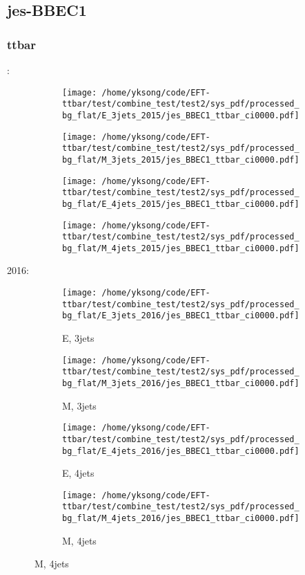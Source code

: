 \documentclass{beamer}
\begin{document}
\subsection{jes-BBEC1}

\begin{frame}
\frametitle{ttbar}
\fontsize{5}{1}:
\begin{figure}
\centering
\begin{subfigure}[b]{0.24\textwidth}
\texttt{[image: /home/yksong/code/EFT-ttbar/test/combine\_test/test2/sys\_pdf/processed\_bg\_flat/E\_3jets\_2015/jes\_BBEC1\_ttbar\_ci0000.pdf]}
\end{subfigure}
\begin{subfigure}[b]{0.24\textwidth}
\texttt{[image: /home/yksong/code/EFT-ttbar/test/combine\_test/test2/sys\_pdf/processed\_bg\_flat/M\_3jets\_2015/jes\_BBEC1\_ttbar\_ci0000.pdf]}
\end{subfigure}
\begin{subfigure}[b]{0.24\textwidth}
\texttt{[image: /home/yksong/code/EFT-ttbar/test/combine\_test/test2/sys\_pdf/processed\_bg\_flat/E\_4jets\_2015/jes\_BBEC1\_ttbar\_ci0000.pdf]}
\end{subfigure}
\begin{subfigure}[b]{0.24\textwidth}
\texttt{[image: /home/yksong/code/EFT-ttbar/test/combine\_test/test2/sys\_pdf/processed\_bg\_flat/M\_4jets\_2015/jes\_BBEC1\_ttbar\_ci0000.pdf]}
\end{subfigure}
\end{figure}
2016:
\begin{figure}
\centering
\begin{subfigure}[b]{0.24\textwidth}
\texttt{[image: /home/yksong/code/EFT-ttbar/test/combine\_test/test2/sys\_pdf/processed\_bg\_flat/E\_3jets\_2016/jes\_BBEC1\_ttbar\_ci0000.pdf]}
\captionsetup{font=tiny}
\caption{E, 3jets}
\end{subfigure}
\begin{subfigure}[b]{0.24\textwidth}
\texttt{[image: /home/yksong/code/EFT-ttbar/test/combine\_test/test2/sys\_pdf/processed\_bg\_flat/M\_3jets\_2016/jes\_BBEC1\_ttbar\_ci0000.pdf]}
\captionsetup{font=tiny}
\caption{M, 3jets}
\end{subfigure}
\begin{subfigure}[b]{0.24\textwidth}
\texttt{[image: /home/yksong/code/EFT-ttbar/test/combine\_test/test2/sys\_pdf/processed\_bg\_flat/E\_4jets\_2016/jes\_BBEC1\_ttbar\_ci0000.pdf]}
\captionsetup{font=tiny}
\caption{E, 4jets}
\end{subfigure}
\begin{subfigure}[b]{0.24\textwidth}
\texttt{[image: /home/yksong/code/EFT-ttbar/test/combine\_test/test2/sys\_pdf/processed\_bg\_flat/M\_4jets\_2016/jes\_BBEC1\_ttbar\_ci0000.pdf]}
\captionsetup{font=tiny}
\caption{M, 4jets}
\end{subfigure}
\end{figure}
\end{frame}
\end{document}
